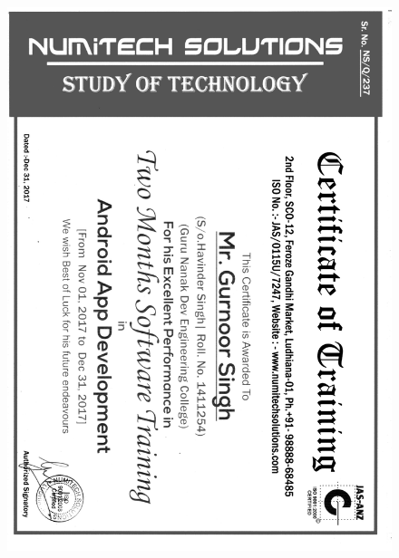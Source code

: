 \begin{figure}
\centering
\includegraphics[scale=0.69]{input/images/numit.png}
\caption{}
\end{figure}\newpage


